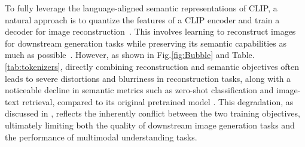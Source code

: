 \begin{minipage}[t]{0.44\textwidth}
    To fully leverage the language-aligned semantic representations of CLIP, a natural approach is to quantize the features of a CLIP encoder and train a decoder for image reconstruction~\citep{wu2025vilau}. This involves learning to reconstruct images for downstream generation tasks while preserving its semantic capabilities as much as possible~\citep{wu2025vilau}.
    However, as shown in Fig.\ref{fig:Bubble} and Table.\ref{tab:tokenizers}, directly combining reconstruction and semantic objectives often leads to severe distortions and blurriness in reconstruction tasks, along with a noticeable decline in semantic metrics such as zero-shot classification and image-text retrieval, compared to its original pretrained model \citep{zhai2023siglip}.
    This degradation, as discussed in \citet{wu2025vilau}, reflects the inherently conflict between the two training objectives, ultimately limiting both the quality of downstream image generation tasks and the performance of multimodal understanding tasks.
\end{minipage}
\hfill
